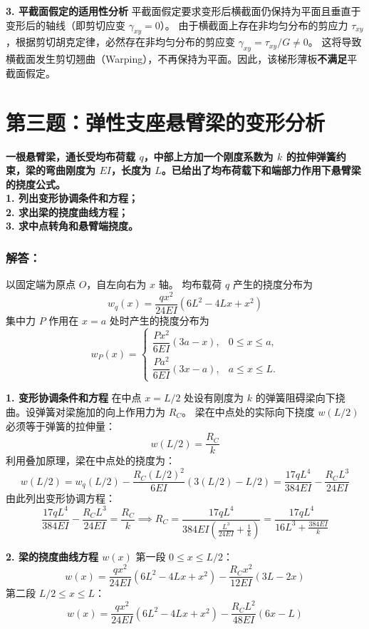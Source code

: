 \documentclass[11pt,a4paper]{ctexrep}
\begin{document}
{\textbf{3. 平截面假定的适用性分析}
平截面假定要求变形后横截面仍保持为平面且垂直于变形后的轴线（即剪切应变 $\gamma_{xy} = 0$）。
由于横截面上存在非均匀分布的剪应力 $\tau_{xy}$，根据剪切胡克定律，必然存在非均匀分布的剪应变 $\gamma_{xy} = \tau_{xy} / G \neq 0$。
这将导致横截面发生剪切翘曲（Warping），不再保持为平面。因此，该梯形薄板\textbf{不满足}平截面假定。




\section*{第三题：弹性支座悬臂梁的变形分析}

\textbf{一根悬臂梁，通长受均布荷载 $q$，中部上方加一个刚度系数为 $k$ 的拉伸弹簧约束，梁的弯曲刚度为 $EI$，长度为 $L$。已给出了均布荷载下和端部力作用下悬臂梁的挠度公式。}\\
\textbf{1. 列出变形协调条件和方程；}\\
\textbf{2. 求出梁的挠度曲线方程；}\\
\textbf{3. 求中点转角和悬臂端挠度。}

\subsubsection*{解答：}

以固定端为原点 $O$，自左向右为 $x$ 轴。
均布载荷 $q$ 产生的挠度分布为
  \[
  w_q(x) = \frac{q x^2}{24 EI} (6 L^2 - 4 L x + x^2)
  \]
集中力 $P$ 作用在 $x=a$ 处时产生的挠度分布为
\[
w_P(x)=
\begin{cases}
\dfrac{P x^2}{6 EI}(3a - x), & 0 \le x \le a,\\[4pt]
\dfrac{P a^2}{6 EI}(3x - a), & a \le x \le L.
\end{cases}
\]

\textbf{1. 变形协调条件和方程}
在中点 $x = L/2$ 处设有刚度为 $k$ 的弹簧阻碍梁向下挠曲。设弹簧对梁施加的向上作用力为 $R_C$。
梁在中点处的实际向下挠度 $w(L/2)$ 必须等于弹簧的拉伸量：
\[
w(L/2) = \frac{R_C}{k}
\]
利用叠加原理，梁在中点处的挠度为：
\[
w(L/2) = w_q(L/2) - \frac{R_C (L/2)^2}{6 EI} (3(L/2) - L/2) = \frac{17 q L^4}{384 EI} - \frac{R_C L^3}{24 EI}
\]
由此列出变形协调方程：
\[
\frac{17 q L^4}{384 EI} - \frac{R_C L^3}{24 EI} = \frac{R_C}{k} \implies R_C = \frac{17 q L^4}{384 EI \left(\frac{L^3}{24 EI} + \frac{1}{k}\right)} = \frac{17 q L^4}{16 L^3 + \frac{384 EI}{k}}
\]

\textbf{2. 梁的挠度曲线方程 $w(x)$}
第一段 $0 \le x \le L/2$：
  \[
  w(x) = \frac{q x^2}{24 EI} (6 L^2 - 4 L x + x^2) - \frac{R_C x^2}{12 EI} (3L - 2x)
  \]
第二段 $L/2 \le x \le L$：
  \[
  w(x) = \frac{q x^2}{24 EI} (6 L^2 - 4 L x + x^2) - \frac{R_C L^2}{48 EI} (6x - L)
  \]

}
\end{document}
